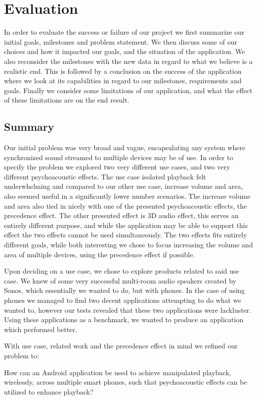 \chapter{Evaluation}\label{cha:conclusion}
In order to evaluate the success or failure of our project we first summarize our initial goals, milestones and problem statement.
We then discuss some of our choices and how it impacted our goals, and the situation of the application.
We also reconsider the milestones with the new data in regard to what we believe is a realistic end.
This is followed by a conclusion on the success of the application where we look at its capabilities in regard to our milestones, requirements and goals.
Finally we consider some limitations of our application, and what the effect of these limitations are on the end result.

\section{Summary}
Our initial problem was very broad and vague, encapsulating any system where synchronized sound streamed to multiple devices may be of use.
In order to specify the problem we explored two very different use cases, and two very different psychoacoustic effects.
The use case isolated playback felt underwhelming and compared to our other use case, increase volume and area, also seemed useful in a significantly lower number scenarios.
The increase volume and area also tied in nicely with one of the presented psychoacoustic effects, the precedence effect.
The other presented effect is 3D audio effect, this serves an entirely different purpose, and while the application may be able to support this effect the two effects cannot be used simultaneously. 
The two effects fits entirely different goals, while both interesting we chose to focus increasing the volume and area of multiple devices, using the precedence effect if possible.

Upon deciding on a use case, we chose to explore products related to said use case.
We knew of some very successful multi-room audio speakers created by Sonos, which essentially we wanted to do, but with phones.
In the case of using phones we managed to find two decent applications attempting to do what we wanted to, however our tests revealed that these two applications were lackluster.
Using these applications as a benchmark, we wanted to produce an application which performed better.

With use case, related work and the precedence effect in mind we refined our problem to:
\begin{problemstatement}
    How can an Android application be used to achieve manipulated playback, wirelessly, across multiple smart phones, such that psychoacoustic effects can be utilized to enhance playback?
\end{problemstatement}

